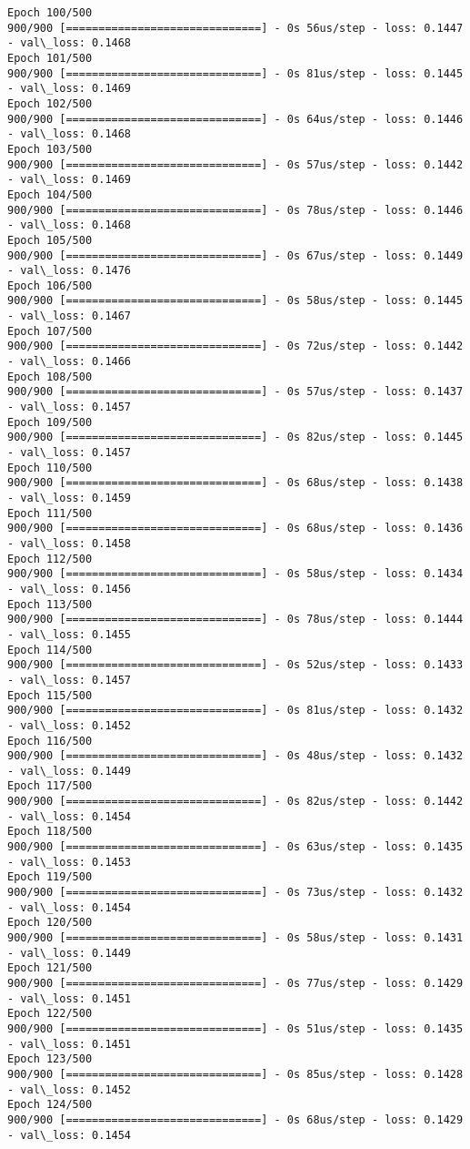 \documentclass[11pt]{article}
\begin{document}
\begin{Verbatim}[commandchars=\\\{\}]
Epoch 100/500
900/900 [==============================] - 0s 56us/step - loss: 0.1447 - val\_loss: 0.1468
Epoch 101/500
900/900 [==============================] - 0s 81us/step - loss: 0.1445 - val\_loss: 0.1469
Epoch 102/500
900/900 [==============================] - 0s 64us/step - loss: 0.1446 - val\_loss: 0.1468
Epoch 103/500
900/900 [==============================] - 0s 57us/step - loss: 0.1442 - val\_loss: 0.1469
Epoch 104/500
900/900 [==============================] - 0s 78us/step - loss: 0.1446 - val\_loss: 0.1468
Epoch 105/500
900/900 [==============================] - 0s 67us/step - loss: 0.1449 - val\_loss: 0.1476
Epoch 106/500
900/900 [==============================] - 0s 58us/step - loss: 0.1445 - val\_loss: 0.1467
Epoch 107/500
900/900 [==============================] - 0s 72us/step - loss: 0.1442 - val\_loss: 0.1466
Epoch 108/500
900/900 [==============================] - 0s 57us/step - loss: 0.1437 - val\_loss: 0.1457
Epoch 109/500
900/900 [==============================] - 0s 82us/step - loss: 0.1445 - val\_loss: 0.1457
Epoch 110/500
900/900 [==============================] - 0s 68us/step - loss: 0.1438 - val\_loss: 0.1459
Epoch 111/500
900/900 [==============================] - 0s 68us/step - loss: 0.1436 - val\_loss: 0.1458
Epoch 112/500
900/900 [==============================] - 0s 58us/step - loss: 0.1434 - val\_loss: 0.1456
Epoch 113/500
900/900 [==============================] - 0s 78us/step - loss: 0.1444 - val\_loss: 0.1455
Epoch 114/500
900/900 [==============================] - 0s 52us/step - loss: 0.1433 - val\_loss: 0.1457
Epoch 115/500
900/900 [==============================] - 0s 81us/step - loss: 0.1432 - val\_loss: 0.1452
Epoch 116/500
900/900 [==============================] - 0s 48us/step - loss: 0.1432 - val\_loss: 0.1449
Epoch 117/500
900/900 [==============================] - 0s 82us/step - loss: 0.1442 - val\_loss: 0.1454
Epoch 118/500
900/900 [==============================] - 0s 63us/step - loss: 0.1435 - val\_loss: 0.1453
Epoch 119/500
900/900 [==============================] - 0s 73us/step - loss: 0.1432 - val\_loss: 0.1454
Epoch 120/500
900/900 [==============================] - 0s 58us/step - loss: 0.1431 - val\_loss: 0.1449
Epoch 121/500
900/900 [==============================] - 0s 77us/step - loss: 0.1429 - val\_loss: 0.1451
Epoch 122/500
900/900 [==============================] - 0s 51us/step - loss: 0.1435 - val\_loss: 0.1451
Epoch 123/500
900/900 [==============================] - 0s 85us/step - loss: 0.1428 - val\_loss: 0.1452
Epoch 124/500
900/900 [==============================] - 0s 68us/step - loss: 0.1429 - val\_loss: 0.1454

\end{Verbatim}
\end{document}
